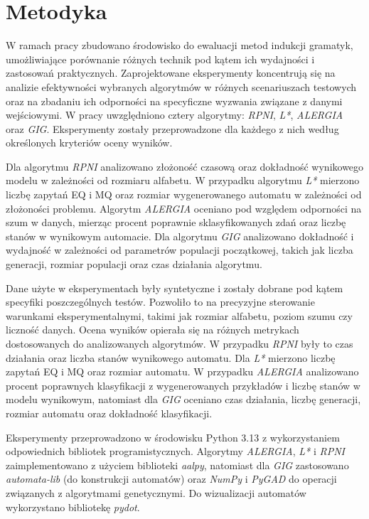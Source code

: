 \chapter{Metodyka}
\label{cha:metodyka}


W ramach pracy zbudowano środowisko do ewaluacji metod indukcji gramatyk, umożliwiające porównanie różnych technik pod kątem ich wydajności i zastosowań praktycznych. Zaprojektowane eksperymenty koncentrują się na analizie efektywności wybranych algorytmów w różnych scenariuszach testowych oraz na zbadaniu ich odporności na specyficzne wyzwania związane z danymi wejściowymi. W pracy uwzględniono cztery algorytmy: \textit{RPNI}, \textit{L*}, \textit{ALERGIA} oraz \textit{GIG}. Eksperymenty zostały przeprowadzone dla każdego z nich według określonych kryteriów oceny wyników.

Dla algorytmu \textit{RPNI} analizowano złożoność czasową oraz dokładność wynikowego modelu w zależności od rozmiaru alfabetu. W przypadku algorytmu \textit{L*} mierzono liczbę zapytań EQ i MQ oraz rozmiar wygenerowanego automatu w zależności od złożoności problemu. Algorytm \textit{ALERGIA} oceniano pod względem odporności na szum w danych, mierząc procent poprawnie sklasyfikowanych zdań oraz liczbę stanów w wynikowym automacie. Dla algorytmu \textit{GIG} analizowano dokładność i wydajność w zależności od parametrów populacji początkowej, takich jak liczba generacji, rozmiar populacji oraz czas działania algorytmu. 

Dane użyte w eksperymentach były syntetyczne i zostały dobrane pod kątem specyfiki poszczególnych testów. Pozwoliło to na precyzyjne sterowanie warunkami eksperymentalnymi, takimi jak rozmiar alfabetu, poziom szumu czy liczność danych. Ocena wyników opierała się na różnych metrykach dostosowanych do analizowanych algorytmów. W przypadku \textit{RPNI} były to czas działania oraz liczba stanów wynikowego automatu. Dla \textit{L*} mierzono liczbę zapytań EQ i MQ oraz rozmiar automatu. W przypadku \textit{ALERGIA} analizowano procent poprawnych klasyfikacji z wygenerowanych przykładów i liczbę stanów w modelu wynikowym, natomiast dla \textit{GIG} oceniano czas działania, liczbę generacji, rozmiar automatu oraz dokładność klasyfikacji.

Eksperymenty przeprowadzono w środowisku Python 3.13 z wykorzystaniem odpowiednich bibliotek programistycznych. Algorytmy \textit{ALERGIA}, \textit{L*} i \textit{RPNI} zaimplementowano z użyciem biblioteki \textit{aalpy}, natomiast dla \textit{GIG} zastosowano \textit{automata-lib} (do konstrukcji automatów) oraz \textit{NumPy} i \textit{PyGAD} \cite{Gad2024} do operacji związanych z algorytmami genetycznymi. Do wizualizacji automatów wykorzystano bibliotekę \textit{pydot}.

